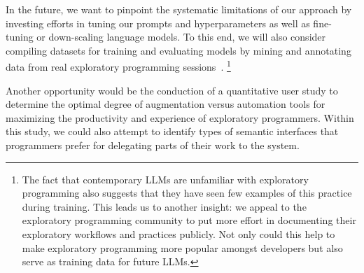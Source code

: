 \ParSep

In the future, we want to pinpoint the systematic limitations of our approach by investing efforts in tuning our prompts and hyperparameters as well as fine-tuning or down-scaling language models.
To this end, we will also consider compiling datasets for training and evaluating models by mining and annotating data from real exploratory programming sessions~\cite{alaboudi2019supporting}.
\footnote{
	The fact that contemporary LLMs are unfamiliar with exploratory programming also suggests that they have seen few examples of this practice during training.
	This leads us to another insight: we appeal to the exploratory programming community to put more effort in documenting their exploratory workflows and practices publicly.
	Not only could this help to make exploratory programming more popular amongst developers but also serve as training data for future LLMs.
}

Another opportunity would be the conduction of a quantitative user study to determine the optimal degree of augmentation versus automation tools for maximizing the productivity and experience of exploratory programmers.
Within this study, we could also attempt to identify types of semantic interfaces that programmers prefer for delegating parts of their work to the system.

